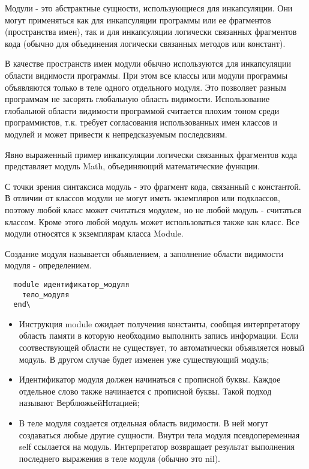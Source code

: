 Модули - это абстрактные сущности, использующиеся для инкапсуляции. Они могут применяться как для инкапсуляции программы или ее фрагментов (пространства имен), так и для инкапсуляции логически связанных фрагментов кода (обычно для объединения логически связанных методов или констант).
\begin{note}
  В качестве пространств имен модули обычно используются для инкапсуляции области видимости программы. При этом все классы или модули программы объявляются только в теле одного отдельного модуля. Это позволяет разным программам не засорять глобальную область видимости. Использование глобальной области видимости программой считается плохим тоном среди программистов, т.к. требует согласования использованных имен классов и модулей и может привести к непредсказуемым последсвиям.

  Явно выраженный пример инкапсуляции логически связанных фрагментов кода представляет модуль Math, объединяющий математические функции.
\end{note}

С точки зрения синтаксиса модуль - это фрагмент кода, связанный с константой. В отличии от классов модули не могут иметь экземпляров или подклассов, поэтому любой класс может считаться модулем, но не любой модуль - считаться классом. Кроме этого любой модуль может использоваться также как класс. Все модули относятся к экземплярам класса Module.

Создание модуля называется объявлением, а заполнение области видимости модуля - определением.
\begin{verbatim}
  module идентификатор_модуля
    тело_модуля
  end\
\end{verbatim}
\begin{itemize}
  \item Инструкция module ожидает получения константы, сообщая интерпретатору область памяти в которую необходимо выполнить запись информации. Если соотвествующей области не существует, то автоматически объявляется новый модуль. В другом случае будет изменен уже существующий модуль;

  \item Идентификатор модуля должен начинаться с прописной буквы. Каждое отдельное слово также начинается с прописной буквы. Такой подход называют ВерблюжьейНотацией;

  \item В теле модуля создается отдельная область видимости. В ней могут создаваться любые другие сущности. Внутри тела модуля псевдопеременная self ссылается на модуль. Интерпретатор возвращает результат выполнения последнего выражения в теле модуля (обычно это nil).
\end{itemize}

